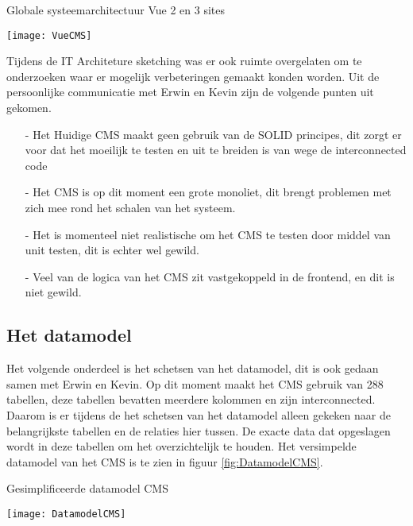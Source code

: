 \begin{graphic}
	\captionsetup{type=figure}
	\caption{Globale systeemarchitectuur Vue 2 en 3 sites}
    \texttt{[image: VueCMS]}
	\label{fig:SystemArchitectureVue}
\end{graphic}

\whitespace
Tijdens de IT Architeture sketching was er ook ruimte overgelaten om te onderzoeken waar er mogelijk verbeteringen gemaakt konden worden.
Uit de persoonlijke communicatie met Erwin en Kevin zijn de volgende punten uit gekomen.

\begin{itemize}
	\item[-]{Het Huidige \gls{CMS} maakt geen gebruik van de SOLID principes, dit zorgt er voor dat het moeilijk te testen en uit te breiden is van wege de interconnected code}
	\item[-]{Het \gls{CMS} is op dit moment een grote monoliet, dit brengt problemen met zich mee rond het schalen van het systeem.}
	\item[-]{Het is momenteel niet realistische om het \gls{CMS} te testen door middel van unit testen, dit is echter wel gewild.}
    \item[-]{Veel van de logica van het CMS zit vastgekoppeld in de frontend, en dit is niet gewild.}
\end{itemize}

\newpage
\subsection{Het datamodel}
Het volgende onderdeel is het schetsen van het datamodel, dit is ook gedaan samen met Erwin en Kevin.
Op dit moment maakt het \gls{CMS} gebruik van 288 tabellen, deze tabellen bevatten meerdere kolommen en zijn interconnected.
Daarom is er tijdens de het schetsen van het datamodel alleen gekeken naar de belangrijkste tabellen en de relaties hier tussen.
De exacte data dat opgeslagen wordt in deze tabellen om het overzichtelijk te houden.
Het versimpelde datamodel van het CMS is te zien in figuur \ref{fig:DatamodelCMS}.

\begin{graphic}
	\captionsetup{type=figure}
	\caption{Gesimplificeerde datamodel CMS}
	\texttt{[image: DatamodelCMS]}
	\label{fig:DatamodelCMS}
\end{graphic}

